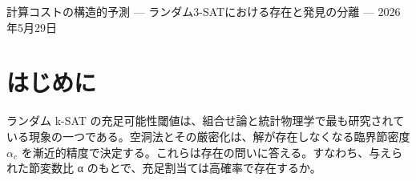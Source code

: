 \documentclass[12pt,a4paper]{article}
\begin{document}
\PaperTitleBlock
  {計算コストの構造的予測}
  {— ランダム3-SATにおける存在と発見の分離 —}
  {2026年5月29日}

\begin{abstract}
解が存在するかどうかと、アルゴリズムがそれを発見できるかどうかは、異なる機構に支配される別の問いである。ランダム 3-SAT では、第一モーメント法により

\[
E[\#\text{SAT}] = N_{\text{eff}} \cdot e^{-L}
\]

が成り立つ。ここで \(L = \alpha\) n\textbar ln(7/8)\textbar{} は節密度の再パラメータ化であり、第一モーメント法の指数そのものである。これは解の存在を特徴づけるが、発見については何も言わない。

本稿では計算予算 μ（ソルバーの操作回数）を導入し、条件つき成功確率 P(found\textbar SAT) が μ/μ\_c(L) の関数として乗法的に分離できるかを問う。3種のソルバー族（CDCL、WalkSAT、ランダム探索）を用い、\(n = 100-300\)変数、\(\alpha = 3.0-4.0\)の範囲で実験した結果、三つの知見を得る。

第一に、中央値実行時間は \(\mu_{c}\) ∝ e\^{}\{cL\} としてスケールし、感度指数 c はソルバーに依存する。CDCL では \(c ≈ 0.24\)、WalkSAT では \(c ≈ 0.21\)、ランダム探索では c = 1.0（厳密）である。

第二に、比 μ/μ\_c は有効な正規化変数であり、両ソルバーとも \(\mu/\mu_{c} = 1\)の付近で単調な遷移を示す。ただし遷移の形状は 14-15\% 異なる。

第三に、c の順序 \(c_{CDCL} > c_{WalkSAT}\)は、テストした全問題サイズ（\(n = 100-300\)）で頑健に成立する。

したがって、同一の構造的パラメータ L が存在（\(c = 1\)、数学的恒等式）と発見（\(c < 1\)、アルゴリズム依存）の双方を支配するが、感度は質的に異なる。とくに c は効率ではなく感度を測る量であり、WalkSAT は c が最小であるにもかかわらず絶対コストは最大である。これは、低感度が構造の活用ではなく構造の無視から生じうることを意味する。
\end{abstract}

\section{はじめに}\label{ux306fux3058ux3081ux306b}

ランダム k-SAT の充足可能性閾値は、組合せ論と統計物理学で最も研究されている現象の一つである。空洞法とその厳密化は、解が存在しなくなる臨界節密度 \(\alpha_{c}\) を漸近的精度で決定する。これらは存在の問いに答える。すなわち、与えられた節変数比 α のもとで、充足割当ては高確率で存在するか。
\end{document}
